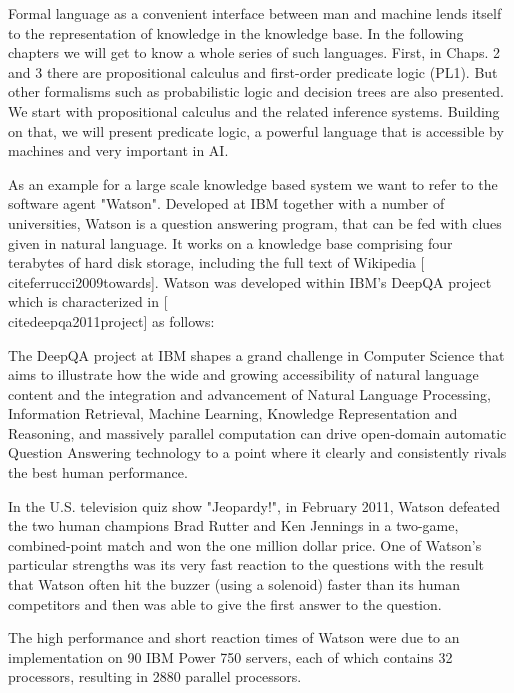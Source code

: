 \documentclass[10pt]{book}
\begin{document}
Formal language as a convenient interface between man and machine lends itself to the representation of knowledge in the knowledge base. In the following chapters we will get to know a whole series of such languages. First, in Chaps. 2 and 3 there are propositional calculus and first-order predicate logic (PL1). But other formalisms such as probabilistic logic and decision trees are also presented. We start with propositional calculus and the related inference systems. Building on that, we will present predicate logic, a powerful language that is accessible by machines and very important in AI.


As an example for a large scale knowledge based system we want to refer to the software agent "Watson". Developed at IBM together with a number of universities, Watson is a question answering program, that can be fed with clues given in natural language. It works on a knowledge base comprising four terabytes of hard disk storage, including the full text of Wikipedia [\\cite{ferrucci2009towards}]. Watson was developed within IBM's DeepQA project which is characterized in [\\cite{deepqa2011project}] as follows:

\begin{displayquote}
The DeepQA project at IBM shapes a grand challenge in Computer Science that aims to illustrate how the wide and growing accessibility of natural language content and the integration and advancement of Natural Language Processing, Information Retrieval, Machine Learning, Knowledge Representation and Reasoning, and massively parallel computation can drive open-domain automatic Question Answering technology to a point where it clearly and consistently rivals the best human performance.
\end{displayquote}

In the U.S. television quiz show "Jeopardy!", in February 2011, Watson defeated the two human champions Brad Rutter and Ken Jennings in a two-game, combined-point match and won the one million dollar price. One of Watson's particular strengths was its very fast reaction to the questions with the result that Watson often hit the buzzer (using a solenoid) faster than its human competitors and then was able to give the first answer to the question.

The high performance and short reaction times of Watson were due to an implementation on 90 IBM Power 750 servers, each of which contains 32 processors, resulting in 2880 parallel processors.
\end{document}
